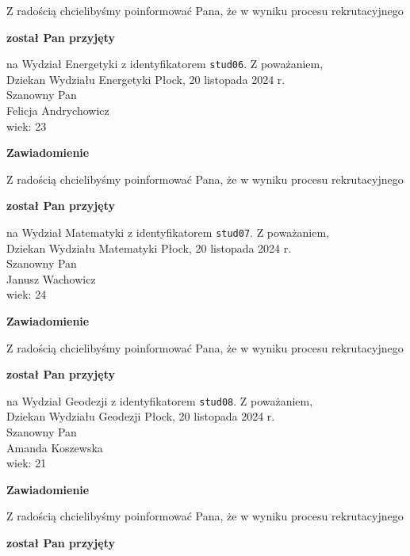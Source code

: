 \documentclass[12pt,a4paper]{article}
\begin{document}
\bigskip
Z radością chcielibyśmy poinformować Pana, że w wyniku procesu rekrutacyjnego 
\begin{center}
\textsf{\textbf{został Pan przyjęty}} 
\end{center}
na Wydział Energetyki z identyfikatorem \verb|stud06|. 
\vspace{2cm}
\noindent
Z poważaniem,\\
Dziekan
Wydziału Energetyki
\newpage
\hfill Płock, 20 listopada 2024 r.\\
\noindent 
Szanowny Pan \\
Felicja Andrychowicz \\
wiek: 23
\bigskip
\begin{center}
 	{\Large\textbf{Zawiadomienie}}
\end{center}
\bigskip
Z radością chcielibyśmy poinformować Pana, że w wyniku procesu rekrutacyjnego 
\begin{center}
\textsf{\textbf{został Pan przyjęty}} 
\end{center}
na Wydział Matematyki z identyfikatorem \verb|stud07|. 
\vspace{2cm}
\noindent
Z poważaniem,\\
Dziekan
Wydziału Matematyki
\newpage
\hfill Płock, 20 listopada 2024 r.\\
\noindent 
Szanowny Pan \\
Janusz Wachowicz \\
wiek: 24
\bigskip
\begin{center}
 	{\Large\textbf{Zawiadomienie}}
\end{center}
\bigskip
Z radością chcielibyśmy poinformować Pana, że w wyniku procesu rekrutacyjnego 
\begin{center}
\textsf{\textbf{został Pan przyjęty}} 
\end{center}
na Wydział Geodezji z identyfikatorem \verb|stud08|. 
\vspace{2cm}
\noindent
Z poważaniem,\\
Dziekan
Wydziału Geodezji
\newpage
\hfill Płock, 20 listopada 2024 r.\\
\noindent 
Szanowny Pan \\
Amanda Koszewska \\
wiek: 21
\bigskip
\begin{center}
 	{\Large\textbf{Zawiadomienie}}
\end{center}
\bigskip
Z radością chcielibyśmy poinformować Pana, że w wyniku procesu rekrutacyjnego 
\begin{center}
\textsf{\textbf{został Pan przyjęty}} 
\end{center}
\end{document}
